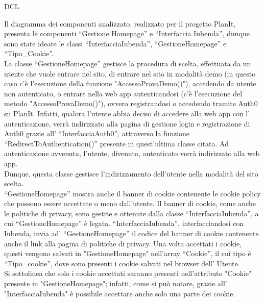 \begin{listaPersonale}{DCL}
    \begin{center}
        
    \end{center}
    \newpage



    Il diagramma dei componenti analizzato, realizzato per il progetto PlanIt, presenta le componenti “Gestione Homepage” e “Interfaccia Iubenda”, dunque sono state ideate le classi “InterfacciaIubenda”, “GestioneHomepage” e “Tipo\_Cookie”.\\
    La classe “GestioneHomepage” gestisce la procedura di scelta, effettuata da un utente che vuole entrare nel sito, di entrare nel sito in modalità demo (in questo caso c'è l'esecuzione della funzione "AccessoProvaDemo()"), accedendo da utente non autenticato, o entrare nella web app autenticandosi (c'è l'esecuzione del metodo "AccessoProvaDemo()"), ovvero registrandosi o accedendo tramite Auth0 su PlanIt. Infatti, qualora l'utente abbia deciso di accedere alla web app con l' autenticazione, verrà indirizzato alla pagina di gestione login e registrazione di Auth0 grazie all' “InterfacciaAuth0”, attraverso la funzione “RedirectToAuthentication()” presente in quest'ultima classe citata. Ad autenticazione avvenuta, l'utente, divenuto, autenticato verrà indirizzato alla web app. \\
    Dunque, questa classe gestisce l'indirizzamento dell'utente nella modalità del sito scelta. \\ “GestioneHomepage” mostra anche il banner di cookie contenente le cookie policy che possono essere accettate o meno dall'utente. Il banner di cookie, come anche le politiche di privacy, sono gestite e ottenute dalla classe “InterfacciaIubenda”, a cui “GestioneHomepage” è legata. “InterfacciaIubenda”, interfacciandosi con Iubenda, invia ad' “GestioneHomepage” il codice del banner di cookie contenente anche il link alla pagina di politiche di privacy. Una volta accettati i cookie, questi vengono salvati in "GestioneHomepage" nell'array “Cookie”, il cui tipo è “Tipo\_cookie”, dove sono presenti i cookie salvati nel browser dell' Utente.\\
    Si sottolinea che solo i cookie accettati saranno presenti nell'attributo "Cookie" presente in "GestioneHomepage"; infatti, come si può notare, grazie all' "InterfacciaIubenda" è possibile accettare anche solo una parte dei cookie.



\end{listaPersonale}
